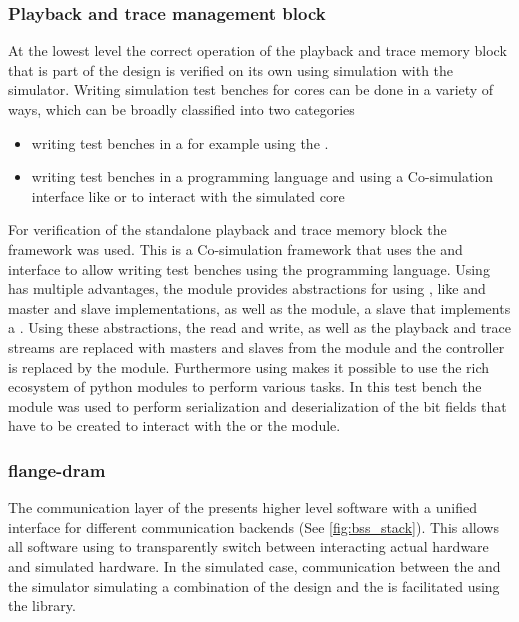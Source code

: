 \subsubsection{Playback and trace management block}
At the lowest level the correct operation of the playback and trace memory block that is part of the \FPGA{} design is verified on its own using simulation with the \xcelium{} simulator.
Writing simulation test benches for \FPGA{} cores can be done in a variety of ways, which can be broadly classified into two categories
\begin{itemize}
    \item writing test benches in a \hdl{} for example using the \uvmframework{}.
    \item writing test benches in a programming language and using a Co-simulation interface like \vpi{} or \dpi{} to interact with the simulated \FPGA{} core
\end{itemize}
For verification of the standalone playback and trace memory block the \cocotb{} framework was used. This is a Co-simulation framework that uses the \vpi{} and \vhpi{} interface to allow writing test benches using the \python{} programming language. Using \cocotb{} has multiple advantages, the \cocotbaxi{} module provides abstractions for using \AXI{}, like \AXI{} and \AXIStream{} master and slave implementations, as well as the \AXIRAM{} module, a \AXI{} slave that implements a \RAM{}. Using these abstractions, the \HostARQ{} read and write, as well as the playback and trace streams are replaced with \AXIStream{} masters and slaves from the \cocotbaxi{} module and the \AXI{} \DRAM{} controller is replaced by the \AXIRAM{} module.
Furthermore using \python{} makes it possible to use the rich ecosystem of python modules to perform various tasks. In this test bench the \construct{} module was used to perform serialization and deserialization of the bit fields that have to be created to interact with the \FAXI{} or the \AXIDMA{} module.

\subsubsection{flange-dram}
The communication layer of the \bssTwoOS{} presents higher level software with a unified interface for different communication backends (See \autoref{fig:bss_stack}). This allows all software using \hxcomm{} to transparently switch between interacting actual hardware and simulated hardware. In the simulated case, communication between the \hxcomm{} and the simulator simulating a combination of the \FPGA{} design and the \ASIC{} is facilitated using the \flange{} library.

